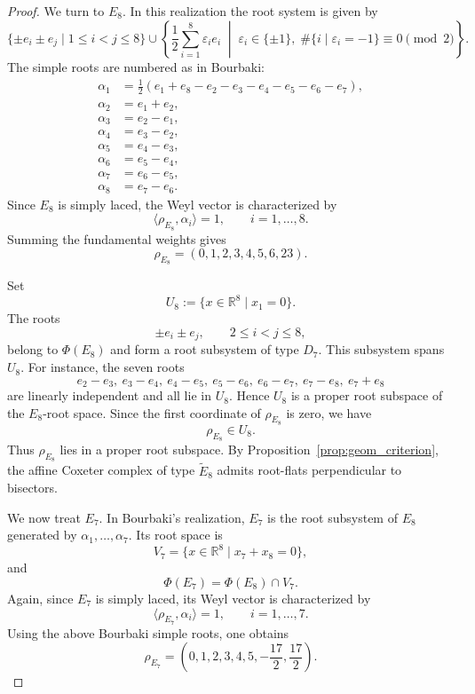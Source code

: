 \documentclass[11pt]{amsart}
\theoremstyle{plain}
\theoremstyle{definition}
\theoremstyle{remark}
\begin{document}
\begin{proof}
		
		We turn to $E_8$. In this realization the root system is given by
		\[
		\{\pm e_i\pm e_j\mid 1\le i<j\le 8\}
		\cup
		\left\{
		\frac12\sum_{i=1}^8 \varepsilon_i e_i
		\;\middle|\;
		\varepsilon_i\in\{\pm1\},\;
		\#\{i\mid \varepsilon_i=-1\}\equiv 0 \pmod 2
		\right\}.
		\]
		The simple roots are numbered as in Bourbaki:
		\[
		\begin{aligned}
			\alpha_1
			&=
			\frac12(e_1+e_8-e_2-e_3-e_4-e_5-e_6-e_7),\\
			\alpha_2&=e_1+e_2,\\
			\alpha_3&=e_2-e_1,\\
			\alpha_4&=e_3-e_2,\\
			\alpha_5&=e_4-e_3,\\
			\alpha_6&=e_5-e_4,\\
			\alpha_7&=e_6-e_5,\\
			\alpha_8&=e_7-e_6.
		\end{aligned}
		\]
		Since \(E_8\) is simply laced, the Weyl vector is characterized by
		\[
		\langle \rho_{E_8},\alpha_i\rangle=1,
		\qquad i=1,\ldots,8.
		\]
		Summing the fundamental weights gives
		\[
		\rho_{E_8}=(0,1,2,3,4,5,6,23).
		\]
		
		Set
		\[
		U_8:=\{x\in\mathbb R^8\mid x_1=0\}.
		\]
		The roots
		\[
		\pm e_i\pm e_j,
		\qquad 2\le i<j\le 8,
		\]
		belong to \(\Phi(E_8)\) and form a root subsystem of type \(D_7\). This
		subsystem spans \(U_8\). For instance, the seven roots
		\[
		e_2-e_3,\ e_3-e_4,\ e_4-e_5,\ e_5-e_6,\ e_6-e_7,\ e_7-e_8,\ e_7+e_8
		\]
		are linearly independent and all lie in \(U_8\). Hence \(U_8\) is a proper
		root subspace of the \(E_8\)-root space. Since the first coordinate of
		\(\rho_{E_8}\) is zero, we have
		\[
		\rho_{E_8}\in U_8.
		\]
		Thus \(\rho_{E_8}\) lies in a proper root subspace. By
		Proposition~\ref{prop:geom_criterion}, the affine Coxeter complex of type
		\(\widetilde E_8\) admits root-flats perpendicular to bisectors.
		
		
		We now treat \(E_7\). In Bourbaki's realization, \(E_7\) is the root
		subsystem of \(E_8\) generated by \(\alpha_1,\ldots,\alpha_7\). Its root
		space is
		\[
		V_7
		=
		\{x\in\mathbb R^8\mid x_7+x_8=0\},
		\]
		and
		\[
		\Phi(E_7)=\Phi(E_8)\cap V_7.
		\]
		Again, since \(E_7\) is simply laced, its Weyl vector is characterized by
		\[
		\langle \rho_{E_7},\alpha_i\rangle=1,
		\qquad i=1,\ldots,7.
		\]
		Using the above Bourbaki simple roots, one obtains
		\[
		\rho_{E_7}
		=
		\left(0,1,2,3,4,5,-\frac{17}{2},\frac{17}{2}\right).
		\]
		

\end{proof}
\end{document}
